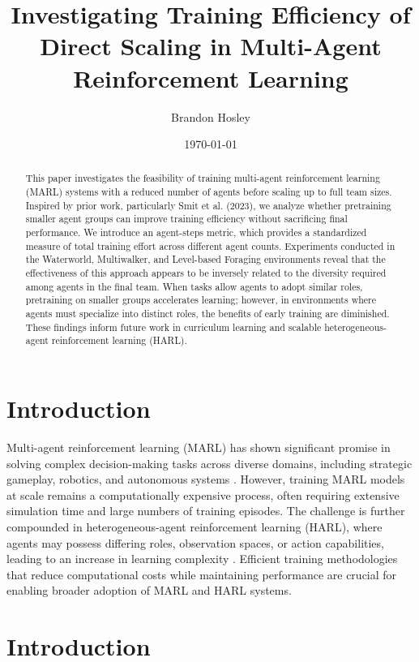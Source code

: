\documentclass{article}
\title{Investigating Training Efficiency of Direct Scaling in Multi-Agent Reinforcement Learning}
\author{Brandon Hosley}
\date{\today}
\begin{document}
\maketitle

\begin{abstract}
    This paper investigates the feasibility of training multi-agent reinforcement learning (MARL) 
    systems with a reduced number of agents before scaling up to full team sizes. 
    Inspired by prior work, particularly Smit et al. (2023), 
    we analyze whether pretraining smaller agent groups can improve training efficiency 
    without sacrificing final performance. 
    We introduce an agent-steps metric, which provides a standardized measure of 
    total training effort across different agent counts.
    Experiments conducted in the Waterworld, Multiwalker, and Level-based Foraging environments 
    reveal that the effectiveness of this approach appears to be inversely related 
    to the diversity required among agents in the final team. 
    When tasks allow agents to adopt similar roles, 
    pretraining on smaller groups accelerates learning; 
    however, in environments where agents must specialize into distinct roles, 
    the benefits of early training are diminished. 
    These findings inform future work in curriculum learning and scalable 
    heterogeneous-agent reinforcement learning (HARL).
\end{abstract}

\section{Introduction}

Multi-agent reinforcement learning (MARL) has shown significant promise in solving complex 
decision-making tasks across diverse domains, including strategic gameplay, robotics, 
and autonomous systems \cite{silver2016, vinyals2019, berner2019}. 
However, training MARL models at scale remains a computationally expensive process, 
often requiring extensive simulation time and large numbers of training episodes. 
The challenge is further compounded in heterogeneous-agent reinforcement learning (HARL), 
where agents may possess differing roles, observation spaces, or action capabilities, 
leading to an increase in learning complexity \cite{rizk2019, yang2021a}.
Efficient training methodologies that reduce computational costs while maintaining 
performance are crucial for enabling broader adoption of MARL and HARL systems.

\section{Introduction}
\end{document}
